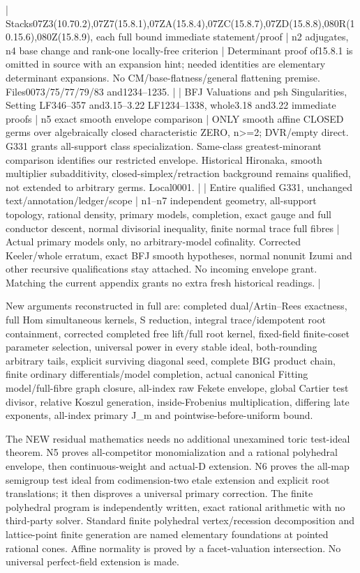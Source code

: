 \documentclass[11pt]{article}
\begin{document}
| Stacks07Z3(10.70.2),07Z7(15.8.1),07ZA(15.8.4),07ZC(15.8.7),07ZD(15.8.8),080R(10.15.6),080Z(15.8.9), each full bound immediate statement/proof | n2 adjugates, n4 base change and rank-one locally-free criterion | Determinant proof of15.8.1 is omitted in source with an expansion hint; needed identities are elementary determinant expansions. No CM/base-flatness/general flattening premise. Files0073/75/77/79/83 and1234--1235. |
| BFJ Valuations and psh Singularities, Setting LF346--357 and3.15--3.22 LF1234--1338, whole3.18 and3.22 immediate proofs | n5 exact smooth envelope comparison | ONLY smooth affine CLOSED germs over algebraically closed characteristic ZERO, n>=2; DVR/empty direct. G331 grants all-support class specialization. Same-class greatest-minorant comparison identifies our restricted envelope. Historical Hironaka, smooth multiplier subadditivity, closed-simplex/retraction background remains qualified, not extended to arbitrary germs. Local0001. |
| Entire qualified G331, unchanged text/annotation/ledger/scope | n1--n7 independent geometry, all-support topology, rational density, primary models, completion, exact gauge and full conductor descent, normal divisorial inequality, finite normal trace full fibres | Actual primary models only, no arbitrary-model cofinality. Corrected Keeler/whole erratum, exact BFJ smooth hypotheses, normal nonunit Izumi and other recursive qualifications stay attached. No incoming envelope grant. Matching the current appendix grants no extra fresh historical readings. |

New arguments reconstructed in full are: completed dual/Artin--Rees exactness, full Hom simultaneous kernels, S reduction, integral trace/idempotent root containment, corrected completed free lift/full root kernel, fixed-field finite-coset parameter selection, universal power in every stable ideal, both-rounding arbitrary tails, explicit surviving diagonal seed, complete BIG product chain, finite ordinary differentials/model completion, actual canonical Fitting model/full-fibre graph closure, all-index raw Fekete envelope, global Cartier test divisor, relative Koszul generation, inside-Frobenius multiplication, differing late exponents, all-index primary J\_m and pointwise-before-uniform bound.

The NEW residual mathematics needs no additional unexamined toric test-ideal theorem. N5 proves all-competitor monomialization and a rational polyhedral envelope, then continuous-weight and actual-D extension. N6 proves the all-map semigroup test ideal from codimension-two etale extension and explicit root translations; it then disproves a universal primary correction. The finite polyhedral program is independently written, exact rational arithmetic with no third-party solver. Standard finite polyhedral vertex/recession decomposition and lattice-point finite generation are named elementary foundations at pointed rational cones. Affine normality is proved by a facet-valuation intersection. No universal perfect-field extension is made.
\end{document}
